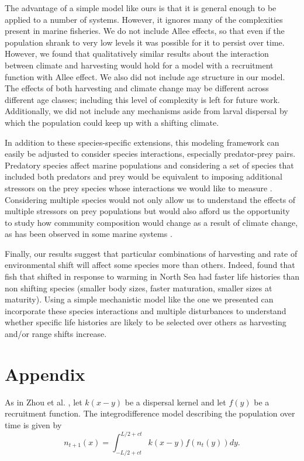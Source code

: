 \documentclass[]{article}
\begin{document}
The advantage of a simple model like ours is that it is general enough to be applied to a number of systems.  However, it  ignores many of the complexities present in marine fisheries. We do 
not include Allee effects, so that even if the population shrank to very low levels it was possible for it to persist 
over time. However, we found that qualitatively similar results about the interaction between climate and 
harvesting would hold for a model with a recruitment function with Allee effect. We also did not include age 
structure in our model. The effects of both harvesting and climate change may be different across different age 
classes; including this level of complexity is left for future work. Additionally, we did not include any 
mechanisms aside from larval dispersal by which the population could keep up with a shifting climate.

In addition to these species-specific extensions, this modeling framework can easily be adjusted to consider 
species interactions, especially predator-prey pairs. Predatory species affect marine populations and 
considering a set of species that included both predators and prey would be equivalent to imposing additional 
stressors on the prey species whose interactions we would like to measure \citep{Lingetal2009, 
Gurevitchetal2000}. Considering multiple species would not only allow us to understand the effects of multiple 
stressors on prey populations but would also afford us the opportunity to study how community composition 
would change as a result of climate change, as has been observed in some marine systems \citep
{Urbanetal2012}.

Finally, our results suggest that particular combinations of harvesting and rate of environmental shift will affect 
some species more than others. Indeed, \citet{Perryetal2005} found that fish that shifted in response to 
warming in North Sea had faster life histories than non shifting species (smaller body sizes, faster maturation, 
smaller sizes at maturity). Using a simple mechanistic model like the one we presented can incorporate these 
species interactions and multiple disturbances to understand whether specific life histories are likely to be 
selected over others as harvesting and/or range shifts increase.


\section{Appendix}

As in Zhou et al. \citep{ZhouKot2011}, let $k(x-y)$ be a dispersal kernel and let $f(y)$ be a recruitment function.  The integrodifference model describing the population over time is given by 
\begin{equation} n_{t+1}(x)=\int_{-L/2+ct}^{L/2+ct}k(x-y)f(n_t(y))dy. \label{integro} \end{equation}
\end{document}
